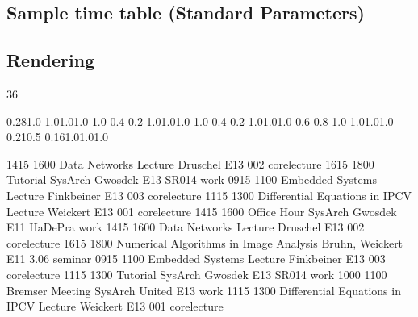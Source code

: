 \documentclass[a4paper,10pt]{article}
\begin{document}
\begin{appendix}
\begin{landscape}
\section{Sample time table (Standard Parameters)}
\subsection{Rendering}

\setslotsize{2.8cm}{0.26cm}
 {36}
\settextframe{0.8mm}

 {0.28}{1.0} {1.0}{1.0}{1.0}
    {1.0} {0.4} {0.2} {1.0}{1.0}{1.0}
 {1.0} {0.4} {0.2} {1.0}{1.0}{1.0}
   {0.6} {0.8} {1.0} {1.0}{1.0}{1.0}
       {0.21}{0.5} {0.16}{1.0}{1.0}{1.0}

\begin{timetable}
  \drawgrid
   {1415} {1600} {Data Networks Lecture}                  {Druschel}        {E1{\tiny 3} 002}     {corelecture}
   {1615} {1800} {Tutorial SysArch}                       {Gwosdek}         {E1{\tiny 3} SR014}   {work}
   {0915} {1100} {Embedded Systems Lecture}               {Finkbeiner}      {E1{\tiny 3} 003}     {corelecture}
   {1115} {1300} {Differential Equations in IPCV Lecture} {Weickert}        {E1{\tiny 3} 001}     {corelecture}
   {1415} {1600} {Office Hour SysArch}                    {Gwosdek}         {E1{\tiny 1} HaDePra} {work}
   {1415} {1600} {Data Networks Lecture}                  {Druschel}        {E1{\tiny 3} 002}     {corelecture}
   {1615} {1800} {Numerical Algorithms in Image Analysis} {Bruhn, Weickert} {E1{\tiny 1} 3.06}    {seminar}
   {0915} {1100} {Embedded Systems Lecture}               {Finkbeiner}      {E1{\tiny 3} 003}     {corelecture}
   {1115} {1300} {Tutorial SysArch}                       {Gwosdek}         {E1{\tiny 3} SR014}   {work}
   {1000} {1100} {Bremser Meeting}                        {SysArch United}  {E1{\tiny 3}}         {work}
   {1115} {1300} {Differential Equations in IPCV Lecture} {Weickert}        {E1{\tiny 3} 001}     {corelecture}
\end{timetable}
\end{landscape}


\end{appendix}
\end{document}
